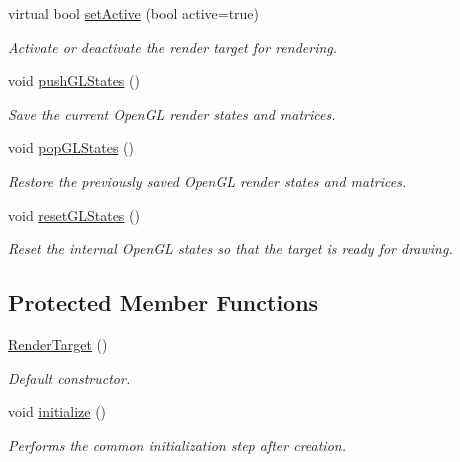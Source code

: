 \begin{DoxyCompactItemize}
virtual bool \mbox{\hyperlink{classsf_1_1_render_target_adc225ead22a70843ffa9b7eebefa0ce1}{set\+Active}} (bool active=true)
\begin{DoxyCompactList}\small\item\em Activate or deactivate the render target for rendering. \end{DoxyCompactList}\item 
void \mbox{\hyperlink{classsf_1_1_render_target_a8d1998464ccc54e789aaf990242b47f7}{push\+G\+L\+States}} ()
\begin{DoxyCompactList}\small\item\em Save the current Open\+GL render states and matrices. \end{DoxyCompactList}\item 
void \mbox{\hyperlink{classsf_1_1_render_target_ad5a98401113df931ddcd54c080f7aa8e}{pop\+G\+L\+States}} ()
\begin{DoxyCompactList}\small\item\em Restore the previously saved Open\+GL render states and matrices. \end{DoxyCompactList}\item 
void \mbox{\hyperlink{classsf_1_1_render_target_aac7504990d27dada4bfe3c7866920765}{reset\+G\+L\+States}} ()
\begin{DoxyCompactList}\small\item\em Reset the internal Open\+GL states so that the target is ready for drawing. \end{DoxyCompactList}\end{DoxyCompactItemize}
\subsection*{Protected Member Functions}
\begin{DoxyCompactItemize}
\item 
\mbox{\hyperlink{classsf_1_1_render_target_a2997c96cbd93cb8ce0aba2ddae35b86f}{Render\+Target}} ()
\begin{DoxyCompactList}\small\item\em Default constructor. \end{DoxyCompactList}\item 
void \mbox{\hyperlink{classsf_1_1_render_target_af530274b34159d644e509b4b4dc43eb7}{initialize}} ()
\begin{DoxyCompactList}\small\item\em Performs the common initialization step after creation. \end{DoxyCompactList}\end{DoxyCompactItemize}
